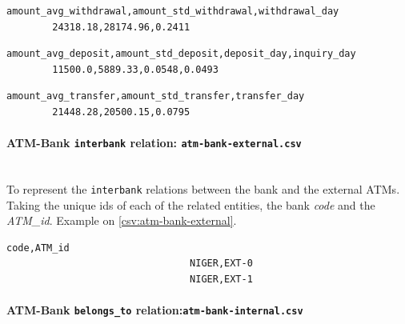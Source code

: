 \begin{center}
\lstset{style=csvStyle}
\begin{lstlisting}[caption={Example of card.csv (Part 2)}]
        amount_avg_withdrawal,amount_std_withdrawal,withdrawal_day
        24318.18,28174.96,0.2411
\end{lstlisting}
\end{center}

\begin{center}
\lstset{style=csvStyle}
\begin{lstlisting}[caption={Example of card.csv (Part 3)}]
        amount_avg_deposit,amount_std_deposit,deposit_day,inquiry_day
        11500.0,5889.33,0.0548,0.0493
\end{lstlisting}
\end{center}

\begin{center}
\lstset{style=csvStyle}
\begin{lstlisting}[caption={Example of card.csv (Part 4)}]
        amount_avg_transfer,amount_std_transfer,transfer_day
        21448.28,20500.15,0.0795
\end{lstlisting}
\end{center}

\paragraph{ATM-Bank \texttt{interbank} relation: \texttt{atm-bank-external.csv}\\\\}

To represent the \texttt{interbank} relations between the bank and the external ATMs. Taking the unique ids of each of the related entities, the bank \emph{code} and the \emph{ATM\_id}. Example on \ref{csv:atm-bank-external}.

\begin{center}
\lstset{style=csvStyle}
\begin{lstlisting}[caption={Example of a atm-bank-external.csv}, label={csv:atm-bank-external}]
                                code,ATM_id
                                NIGER,EXT-0
                                NIGER,EXT-1
\end{lstlisting}
\end{center}

\paragraph{ATM-Bank \texttt{belongs\_to} relation:\texttt{atm-bank-internal.csv}\\\\}

